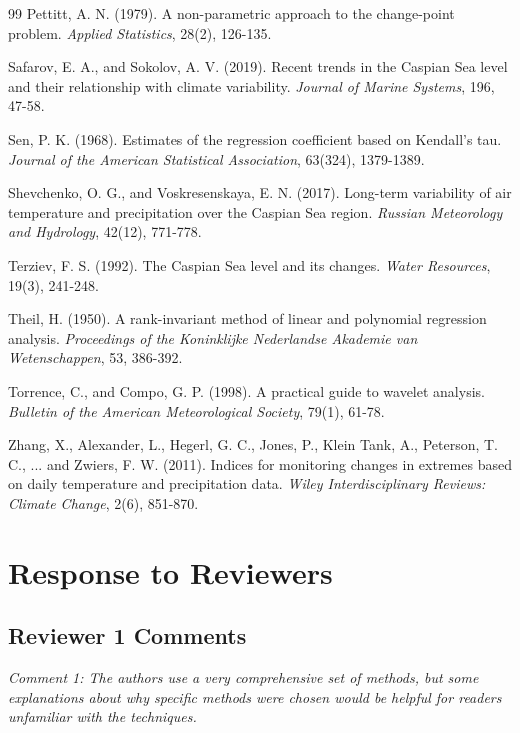 \documentclass[12pt,a4paper]{article}
\begin{document}
\begin{thebibliography}{99}
Pettitt, A. N. (1979). A non-parametric approach to the change-point problem. \textit{Applied Statistics}, 28(2), 126-135.

Safarov, E. A., and Sokolov, A. V. (2019). Recent trends in the Caspian Sea level and their relationship with climate variability. \textit{Journal of Marine Systems}, 196, 47-58.

Sen, P. K. (1968). Estimates of the regression coefficient based on Kendall's tau. \textit{Journal of the American Statistical Association}, 63(324), 1379-1389.

Shevchenko, O. G., and Voskresenskaya, E. N. (2017). Long-term variability of air temperature and precipitation over the Caspian Sea region. \textit{Russian Meteorology and Hydrology}, 42(12), 771-778.

Terziev, F. S. (1992). The Caspian Sea level and its changes. \textit{Water Resources}, 19(3), 241-248.

Theil, H. (1950). A rank-invariant method of linear and polynomial regression analysis. \textit{Proceedings of the Koninklijke Nederlandse Akademie van Wetenschappen}, 53, 386-392.

Torrence, C., and Compo, G. P. (1998). A practical guide to wavelet analysis. \textit{Bulletin of the American Meteorological Society}, 79(1), 61-78.

Zhang, X., Alexander, L., Hegerl, G. C., Jones, P., Klein Tank, A., Peterson, T. C., ... and Zwiers, F. W. (2011). Indices for monitoring changes in extremes based on daily temperature and precipitation data. \textit{Wiley Interdisciplinary Reviews: Climate Change}, 2(6), 851-870.

\end{thebibliography}

\newpage
\appendix
\section{Response to Reviewers}

\subsection*{Reviewer 1 Comments}

\textit{Comment 1: The authors use a very comprehensive set of methods, but some explanations about why specific methods were chosen would be helpful for readers unfamiliar with the techniques.}
\end{document}
